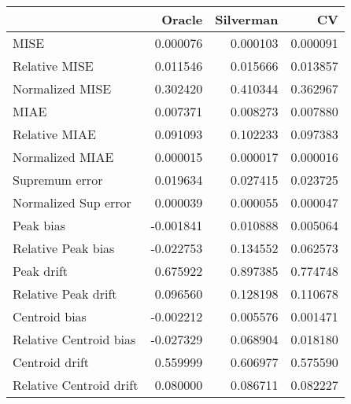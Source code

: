 \begin{tabular}{lrrr}
  \toprule
 & Oracle & Silverman & CV \\ 
  \midrule
MISE & 0.000076 & 0.000103 & 0.000091 \\ 
  Relative MISE & 0.011546 & 0.015666 & 0.013857 \\ 
  Normalized MISE & 0.302420 & 0.410344 & 0.362967 \\ 
  MIAE & 0.007371 & 0.008273 & 0.007880 \\ 
  Relative MIAE & 0.091093 & 0.102233 & 0.097383 \\ 
  Normalized MIAE & 0.000015 & 0.000017 & 0.000016 \\ 
  Supremum error & 0.019634 & 0.027415 & 0.023725 \\ 
  Normalized Sup error & 0.000039 & 0.000055 & 0.000047 \\ 
  Peak bias & -0.001841 & 0.010888 & 0.005064 \\ 
  Relative Peak bias & -0.022753 & 0.134552 & 0.062573 \\ 
  Peak drift & 0.675922 & 0.897385 & 0.774748 \\ 
  Relative Peak drift & 0.096560 & 0.128198 & 0.110678 \\ 
  Centroid bias & -0.002212 & 0.005576 & 0.001471 \\ 
  Relative Centroid bias & -0.027329 & 0.068904 & 0.018180 \\ 
  Centroid drift & 0.559999 & 0.606977 & 0.575590 \\ 
  Relative Centroid drift & 0.080000 & 0.086711 & 0.082227 \\ 
   \bottomrule
\end{tabular}
